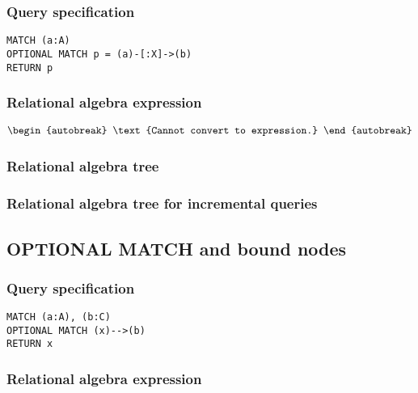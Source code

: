 \subsubsection*{Query specification}

\begin{lstlisting}
MATCH (a:A)
OPTIONAL MATCH p = (a)-[:X]->(b)
RETURN p
\end{lstlisting}

\subsubsection*{Relational algebra expression}

\begin{align*}
\begin{autobreak}
\text{Cannot convert to expression.}
\end{autobreak}
\end{align*}

\subsubsection*{Relational algebra tree}


\subsubsection*{Relational algebra tree for incremental queries}


\subsection{OPTIONAL MATCH and bound nodes}

\subsubsection*{Query specification}

\begin{lstlisting}
MATCH (a:A), (b:C)
OPTIONAL MATCH (x)-->(b)
RETURN x
\end{lstlisting}

\subsubsection*{Relational algebra expression}


